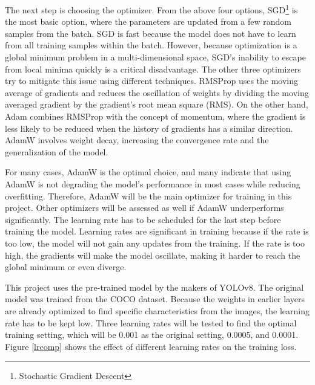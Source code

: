 The next step is choosing the optimizer. From the above four options, SGD\footnote{Stochastic Gradient Descent} is the most basic option, where the parameters are updated from a few random samples from the batch. SGD is fast because the model does not have to learn from all training samples within the batch. However, because optimization is a global minimum problem in a multi-dimensional space, SGD's inability to escape from local minima quickly is a critical disadvantage. The other three optimizers try to mitigate this issue using different techniques. RMSProp uses the moving average of gradients and reduces the oscillation of weights by dividing the moving averaged gradient by the gradient's root mean square (RMS). On the other hand, Adam combines RMSProp with the concept of momentum, where the gradient is less likely to be reduced when the history of gradients has a similar direction. AdamW involves weight decay, increasing the convergence rate and the generalization of the model. 

For many cases, AdamW is the optimal choice, and many indicate that using AdamW is not degrading the model's performance in most cases while reducing overfitting.\cite{adamw} Therefore, AdamW will be the main optimizer for training in this project. Other optimizers will be assessed as well if AdamW underperforms significantly. 
\newpage
The learning rate has to be scheduled for the last step before training the model. Learning rates are significant in training because if the rate is too low, the model will not gain any updates from the training. If the rate is too high, the gradients will make the model oscillate, making it harder to reach the global minimum or even diverge. 

This project uses the pre-trained model by the makers of YOLOv8. The original model was trained from the COCO dataset. \cite{coco} Because the weights in earlier layers are already optimized to find specific characteristics from the images, the learning rate has to be kept low. Three learning rates will be tested to find the optimal training setting, which will be 0.001 as the original setting, 0.0005, and 0.0001. Figure \ref{lrcomp} shows the effect of different learning rates on the training loss.

